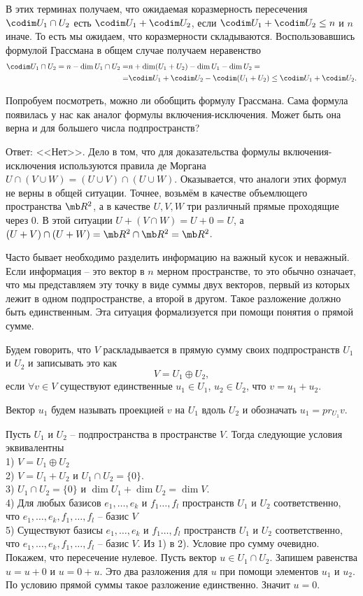 В этих терминах получаем, что ожидаемая коразмерность пересечения $\codim U_1\cap U_2$ есть $\codim U_1 + \codim U_2$, если $\codim U_1 + \codim U_2 \leq n$ и $n$ иначе. То есть мы ожидаем, что коразмерности складываются. Воспользовавшись формулой Грассмана в общем случае получаем неравенство
\begin{align*} \codim U_1 \cap U_2 = n -\dim U_1 \cap U_2=& n+\dim (U_1+U_2)-\dim U_1-\dim U_2=\\
=&\codim U_1+\codim U_2 - \codim (U_1 +U_2) \leq \codim U_1+\codim U_2.
\end{align*}

Попробуем посмотреть, можно ли обобщить формулу Грассмана. Сама формула появилась у нас как аналог формулы включения-исключения. Может быть она верна и для большего числа подпространств? 

Ответ: <<Нет>>. Дело в том, что для доказательства формулы включения-исключения используются правила де Моргана $U\cap (V \cup W)=(U\cup V)\cap (U\cup W)$. Оказывается, что аналоги этих формул не верны в общей ситуации. Точнее, возьмём в качестве объемлющего пространства  $\mb R^2$, а в качестве $U,V,W$ три различный прямые проходящие через 0. В этой ситуации $U + (V \cap W)=U+0=U$, а $(U+V)\cap(U+W)=\mb R^2 \cap \mb R^2= \mb R^2$. 


Часто бывает необходимо разделить информацию на важный кусок и неважный. Если информация -- это вектор в $n$ мерном пространстве, то это обычно означает, что мы представляем эту точку в виде суммы двух векторов, первый из которых лежит в одном подпространстве, а второй в другом. Такое разложение должно быть единственным. Эта ситуация формализуется при помощи понятия о прямой сумме.

\dfn Будем говорить, что $V$ раскладывается в прямую сумму своих подпространств $U_1$ и $U_2$ и записывать это как
$$V=U_1\oplus U_2,$$
если $\forall v\in V$ существуют единственные $u_1\in U_1$, $u_2\in U_2$, что $v=u_1+u_2$.
\edfn

Вектор $u_1$ будем называть проекцией $v$ на $U_1$ вдоль $U_2$ и обозначать $u_1=pr_{U_1}v$.

 Пусть $U_1$ и $U_2$ -- подпространства в пространстве $V$. Тогда следующие условия эквивалентны\\
1) $V=U_1\oplus U_2$\\
2) $V=U_1+U_2$ и $U_1\cap U_2=\{0\}$.\\
3) $U_1\cap U_2=\{0\}$ и $\dim U_1+\dim U_2=\dim V$.\\
4) Для любых базисов $e_1,\dots,e_k$   и $f_1\dots,f_l$ пространств $U_1$ и $U_2$ соответственно, что  $e_1,\dots,e_k,f_1,\dots,f_l$ -- базис $V$\\
5) Существуют базисы $e_1,\dots,e_k$   и $f_1\dots,f_l$ пространств $U_1$ и $U_2$ соответственно, что $e_1,\dots,e_k,f_1,\dots,f_l$ -- базис $V$.
\ethrm
\proof Из 1) в 2). Условие про сумму очевидно. Покажем, что пересечение нулевое. Пусть вектор $u \in U_1\cap U_2$. Запишем равенства $u=u+0$ и $u=0+u$. Это два разложения для $u$ при помощи элементов $u_1$ и $u_2$. По условию прямой суммы такое разложение единственно. Значит $u=0$.


